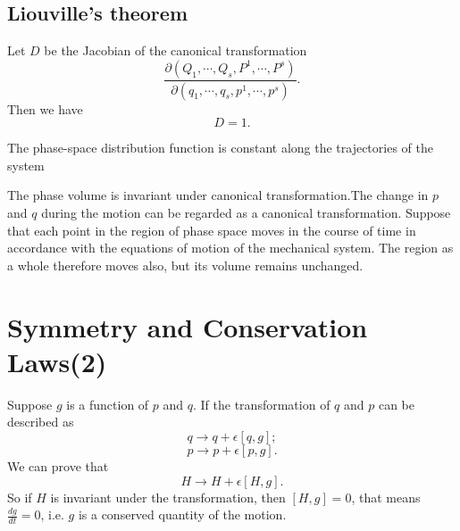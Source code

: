 \subsection{Liouville's theorem}
\begin{newlemma}
Let $D$ be the Jacobian of the canonical transformation 
\[\frac{\partial(Q_1,\cdots,Q_s,P^1,\cdots,P^s)}{\partial(q_1,\cdots,q_s,p^1,\cdots,p^s)}.\]
Then we have
\[D=1.\]
\end{newlemma}

\begin{newthem}
The phase-space distribution function is constant along the trajectories of the system
\end{newthem}

\begin{newproof}
The phase volume is invariant under canonical transformation.The change in $p$ and $q$ during the motion can be regarded as a canonical transformation. Suppose that each point in the region of phase space moves in the course of time in accordance with the equations of motion of the mechanical system. The region as a whole therefore moves also, but its volume remains unchanged.
\end{newproof}

\section{Symmetry and Conservation Laws(2)}
Suppose $g$ is a function of $p$ and $q$. If the transformation of $q$ and $p$ can be described as
\[q \rightarrow q + \epsilon [q,g];\]
\[p \rightarrow p + \epsilon [p,g].\]
We can prove that 
\[H \rightarrow H + \epsilon[H,g].\]
So if $H$ is invariant under the transformation, then $[H,g] = 0$, that means $\frac{dg}{dt} = 0$, i.e. $g$ is a conserved quantity of the motion.

